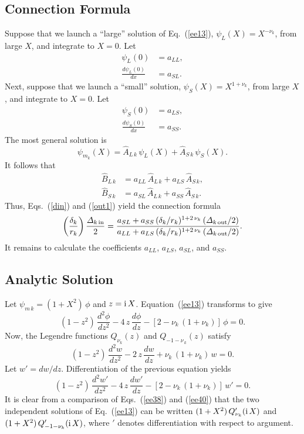 \documentclass[12pt,prb,aps]{revtex4-1}
\begin{document}
\subsection{Connection Formula}
Suppose that we launch a  ``large''  solution  of Eq.~(\ref{ee13}), $\psi_L(X) = X^{-\nu_k}$, 
from large $X$, and integrate to $X=0$. Let
\begin{align}
\psi_L(0) &= a_{LL},\\[0.5ex]
\frac{d\psi_L(0)}{dx} &= a_{SL}.
\end{align}
Next, suppose that we launch a  ``small'' solution, 
$\psi_S(X) = X^{1+\nu_k}$, 
from large $X$, and integrate to  $X=0$. Let
\begin{align}
\psi_S(0) &= a_{LS},\\[0.5ex]
\frac{d\psi_S(0)}{dx} &= a_{SS}.
\end{align}
The most general solution is
\begin{equation}
\psi_{m_k}(X) = \hat{A}_{L\,k}\,\psi_L(X)+ \hat{A}_{S\,k}\,\psi_S(X).
\end{equation}
It follows that
\begin{align}\label{bin}
\hat{B}_{L\,k} &= a_{LL}\,\hat{A}_{L\,k} + a_{LS}\,\hat{A}_{S\,k},\\[0.5ex]
\hat{B}_{S\,k}&= a_{SL}\,\hat{A}_{L\,k} + a_{SS}\,\hat{A}_{S\,k}.\label{bout}
\end{align}
Thus,  Eqs.~(\ref{din}) and (\ref{out1}) yield the connection formula
\begin{equation}\label{ee20}
\left(\frac{\delta_k}{r_k}\right)\frac{{\mit\Delta}_{k \,{\rm in}}}{2}= \frac{a_{SL} +a_{SS}\,(\delta_k/r_k)^{1+2\,\nu_k}\,({\mit\Delta}_{k\,{\rm out}}/2)}
{a_{LL}  +a_{LS}\,(\delta_k/r_k)^{1+2\,\nu_k}\,({\mit\Delta}_{k\,{\rm out}}/2)}.
\end{equation}
It remains to calculate the coefficients $a_{LL}$, $a_{LS}$, $a_{SL}$, and $a_{SS}$. 

\subsection{Analytic Solution}
Let $\psi_{m\,k} = (1+X^2)\,\phi$ and $z={\rm i}\,X$. Equation~(\ref{ee13}) transforms to give 
\begin{equation}\label{ee38}
(1-z^2)\,\frac{d^2\phi}{dz^2} - 4\,z\,\frac{d\phi}{dz} - [2-\nu_k\,(1+\nu_k)]\,\phi=0.
\end{equation}
Now, the Legendre functions $Q_{\nu_k}(z)$ and $Q_{-1-\nu_{\,k}}(z)$ satisfy\,\cite{abramc}
\begin{equation}
(1-z^2)\,\frac{d^2 w}{dz^2} - 2\,z\,\frac{dw}{dz} + \nu_k\,(1+\nu_k)\,w = 0.
\end{equation}
Let $w'=dw/dz$. Differentiation of the previous equation yields
\begin{equation}\label{ee40}
(1-z^2)\,\frac{d^2w'}{dz^2} - 4\,z\,\frac{dw'}{dz} - [2-\nu_k\,(1+\nu_k)]\,w'=0.
\end{equation}
It is clear from a comparison of Eqs.~(\ref{ee38}) and (\ref{ee40}) that the two independent solutions of Eq.~(\ref{ee13}) can be written 
$(1+X^2)\,Q_{\nu_k}'({\rm i}\,X)$ and $(1+X^2)\,Q_{-1-\nu_k}'({\rm i}\,X)$, where $'$ denotes differentiation with respect to argument. 
\end{document}
